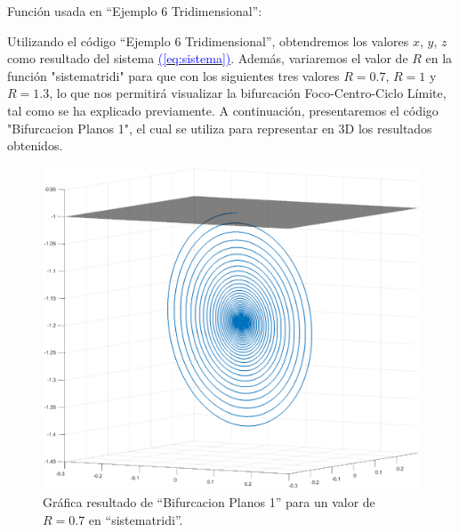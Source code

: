 \documentclass[12pt,a4paper]{report} %
\newcommand{\eref}[1]{\hyperref[#1]{\textcolor{blue}{(\ref*{#1})}}}
\newcommand{\eref}[1]{\hyperref[#1]{\textcolor{blue}{\textit{(\ref*{#1})}}}}
\begin{document}
	\vspace{0.5cm}
	
	\vspace{0.5cm}\noindent Función usada en ``Ejemplo 6 Tridimensional'':
	\vspace{0.5cm}
	
	\newpage
	
	\noindent Utilizando el código ``Ejemplo 6 Tridimensional'', obtendremos los valores $x$, $y$, $z$ como resultado del sistema \eref{eq:sistema}. Además, variaremos el valor de $R$ en la función "sistematridi" para que con los siguientes tres valores $R=0.7$, $R=1$ y $R=1.3$, lo que nos permitirá visualizar la bifurcación Foco-Centro-Ciclo Límite, tal como se ha explicado previamente. A continuación, presentaremos el código "Bifurcacion Planos 1", el cual se utiliza para representar en 3D los resultados obtenidos.
	
	\vspace{0.5cm}
	
	\newpage
	
	\begin{figure}[h]
		\centering
		\includegraphics[width=1\textwidth]{fococir.eps}
		\caption{Gráfica resultado de ``Bifurcacion Planos 1'' para un valor de $R=0.7$ en ``sistematridi''.}
		\label{fig:fococircuito}
	\end{figure}\smallskip
	
\end{document}

